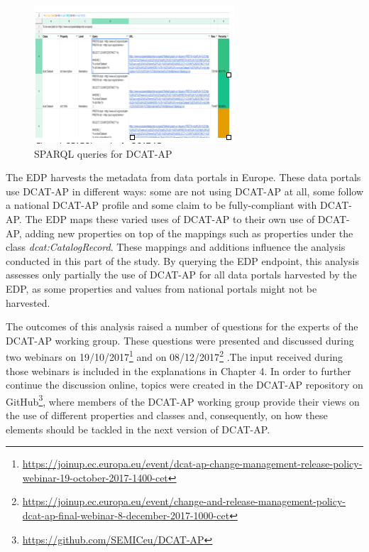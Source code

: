 \documentclass[<options>]{elsarticle}
\begin{document}
\begin{figure}[!h]
\includegraphics{replace1.png}
\caption{SPARQL queries for DCAT-AP}
\end{figure}

The EDP harvests the metadata from data portals in Europe. These data portals use DCAT-AP in different ways: some are not using DCAT-AP at all, some follow a national DCAT-AP profile and some claim to be fully-compliant with DCAT-AP. The EDP maps these varied uses of DCAT-AP to their own use of DCAT-AP, adding new properties on top of the mappings such as properties under the class \textit{dcat:CatalogRecord}. These mappings and additions influence the analysis conducted in this part of the study. By querying the EDP endpoint, this analysis assesses only partially the use of DCAT-AP for all data portals harvested by the EDP, as some properties and values from national portals might not be harvested.

The outcomes of this analysis raised a number of questions for the experts of the DCAT-AP working group. These questions were presented and discussed during two webinars on 19/10/2017\footnote{\href{ https://joinup.ec.europa.eu/event/dcat-ap-change-management-release-policy-webinar-19-october-2017-1400-cet}{ https://joinup.ec.europa.eu/event/dcat-ap-change-management-release-policy-webinar-19-october-2017-1400-cet}} and on 08/12/2017\footnote{\href{ https://joinup.ec.europa.eu/event/change-and-release-management-policy-dcat-ap-final-webinar-8-december-2017-1000-cet}{ https://joinup.ec.europa.eu/event/change-and-release-management-policy-dcat-ap-final-webinar-8-december-2017-1000-cet}} .The input received during those webinars is included in the explanations in Chapter 4. In order to further continue the discussion online, topics were created in the DCAT-AP repository on GitHub\footnote{\href{  https://github.com/SEMICeu/DCAT-AP}{  https://github.com/SEMICeu/DCAT-AP}}, where members of the DCAT-AP working group provide their views on the use of different properties and classes and, consequently, on how these elements should be tackled in the next version of DCAT-AP.
\end{document}
